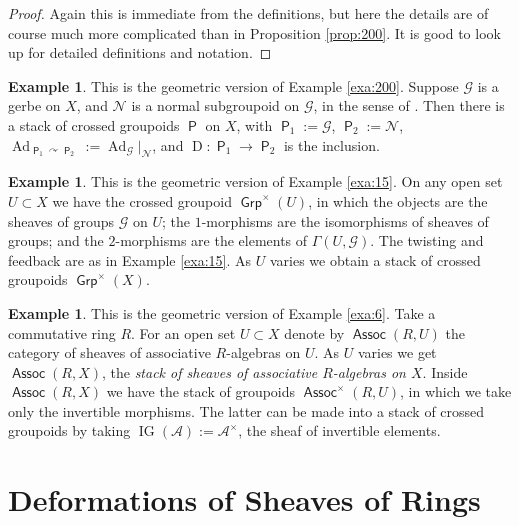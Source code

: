 \documentclass[a4paper, 10pt]{amsart}
\theoremstyle{definition}
\newtheorem{exa}[equation]{Example}
\numberwithin{equation}{section}
\newcommand{\opn}{\operatorname}
\newcommand{\cat}[1]{\operatorname{\mathsf{#1}}}
\newcommand{\mcal}[1]{\mathcal{#1}}
\newcommand{\bsym}[1]{\boldsymbol{#1}}
\newcommand{\gerbe}[1]{\bsym{\mcal{#1}}}
\newcommand{\twocat}[1]{\operatorname{\bsym{\cat{#1}}}}
\newcommand{\crvar}{\curvearrowright}
\begin{document}
\begin{proof}
Again this is immediate from the definitions, but here the details are of
course much more complicated than in Proposition \ref{prop:200}.
It is good to look up \cite[Section 2]{Ye4} for detailed definitions and
notation. 
\end{proof}

\begin{exa}
This is the geometric version of Example \ref{exa:200}.
Suppose $\gerbe{G}$ is a gerbe on $X$, and $\gerbe{N}$ is a normal subgroupoid
on $\gerbe{G}$, in the sense of \cite[Definition 3.6]{Ye4}.
Then there is a stack of crossed groupoids $\twocat{P}$ on $X$, with 
$\twocat{P}_1 := \gerbe{G}$, $\twocat{P}_2 := \gerbe{N}$,
$\opn{Ad}_{\twocat{P}_1 \crvar \twocat{P}_{2}} :=
{\opn{Ad}_{\gerbe{G}}}|_{\gerbe{N}}$,
and $\opn{D} : \twocat{P}_1 \to \twocat{P}_{2}$ is the inclusion. 
\end{exa}

\begin{exa} \label{exa:9}
This is the geometric version of Example \ref{exa:15}.
On any open set $U \subset X$ we have the crossed groupoid 
$\cat{Grp}^{\times}(U)$, in which the objects are the sheaves of groups
$\mcal{G}$ on $U$; the $1$-morphisms are the isomorphisms of sheaves of groups;
and the $2$-morphisms are the elements of $\Gamma(U, \mcal{G})$. 
The twisting and feedback are as in Example \ref{exa:15}.
As $U$ varies we obtain a stack of crossed groupoids
$\twocat{Grp}^{\times}(X)$.
\end{exa}

\begin{exa} \label{exa:10}
This is the geometric version of Example \ref{exa:6}.
Take a commutative ring $R$. For an open set
$U \subset X$ denote by $\cat{Assoc}(R, U)$ the category 
of sheaves of associative $R$-algebras on $U$. As $U$ varies we get 
$\twocat{Assoc}(R, X)$, the {\em stack of sheaves of associative $R$-algebras on
$X$}. Inside $\twocat{Assoc}(R, X)$ we have the stack of groupoids 
$\twocat{Assoc}^{\times}(R, U)$, in which we take only the invertible
morphisms. The latter can be made into a stack of crossed groupoids by taking
$\opn{IG}(\mcal{A}) := \mcal{A}^{\times}$, the sheaf of invertible elements. 
\end{exa}










\section{Deformations of Sheaves of Rings}
\label{sec:defs-alg-vars}
\end{document}
